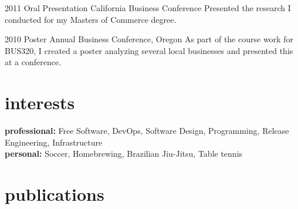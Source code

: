\documentclass[]{friggeri-cv} %
\begin{document}
\begin{entrylist}


\entry
{2011}
{Oral Presentation}
{California Business Conference}
{Presented the research I conducted for my Masters of Commerce degree.}


\entry
{2010}
{Poster}
{Annual Business Conference, Oregon}
{As part of the course work for BUS320, I created a poster analyzing several local businesses and presented this at a conference.}


\end{entrylist}


\section{interests}

\textbf{professional:} Free Software, DevOps, Software Design, Programming, Release Engineering, Infrastructure\\
\textbf{personal:} Soccer, Homebrewing, Brazilian Jiu-Jitsu, Table tennis


\section{publications}



\begin{refsection} %
\nocite{*}
\printbibliography[sorting=chronological, type=inproceedings, title={international peer-reviewed conferences/proceedings}, notkeyword={brazil}, heading=bibheading]
\end{refsection}
\end{document}

